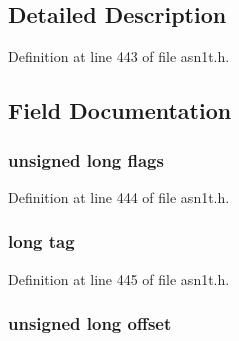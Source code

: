 \subsection{Detailed Description}


Definition at line 443 of file asn1t.\+h.



\subsection{Field Documentation}
\subsubsection[{\texorpdfstring{flags}{flags}}]{\setlength{\rightskip}{0pt plus 5cm}unsigned long flags}\hypertarget{struct_a_s_n1___t_e_m_p_l_a_t_e__st_a9e339c2784bd040b26a5112866700bff}{}\label{struct_a_s_n1___t_e_m_p_l_a_t_e__st_a9e339c2784bd040b26a5112866700bff}


Definition at line 444 of file asn1t.\+h.

\subsubsection[{\texorpdfstring{tag}{tag}}]{\setlength{\rightskip}{0pt plus 5cm}long tag}\hypertarget{struct_a_s_n1___t_e_m_p_l_a_t_e__st_ae10c29173f0af40507d7e787905c7130}{}\label{struct_a_s_n1___t_e_m_p_l_a_t_e__st_ae10c29173f0af40507d7e787905c7130}


Definition at line 445 of file asn1t.\+h.

\subsubsection[{\texorpdfstring{offset}{offset}}]{\setlength{\rightskip}{0pt plus 5cm}unsigned long offset}\hypertarget{struct_a_s_n1___t_e_m_p_l_a_t_e__st_ac1369a1f209735864674d22517edfa76}{}\label{struct_a_s_n1___t_e_m_p_l_a_t_e__st_ac1369a1f209735864674d22517edfa76}


